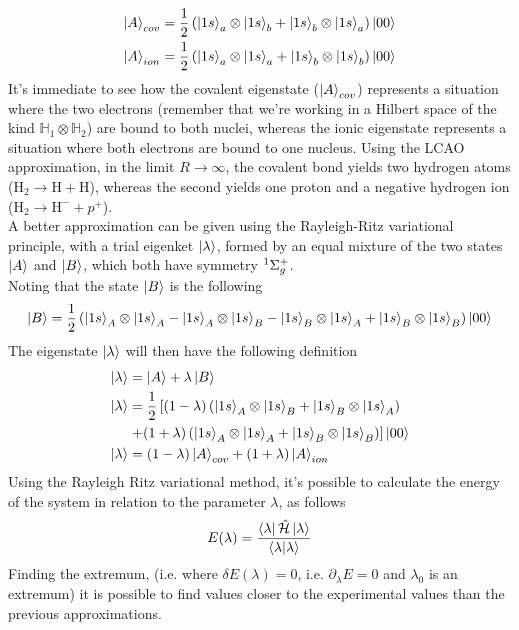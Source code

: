 \documentclass[../qm.tex]{subfiles}
\begin{document}
	\begin{equation}
		\begin{aligned}
			\ket{A}_{cov}&=\frac{1}{2}\left( \ket{1s}_a\otimes\ket{1s}_b+\ket{1s}_b\otimes\ket{1s}_a \right)\ket{00}\\
			\ket{A}_{ion}&=\frac{1}{2}\left( \ket{1s}_a\otimes\ket{1s}_a+\ket{1s}_b\otimes\ket{1s}_b \right)\ket{00}
		\end{aligned}
		\label{eq:ioniccovalentbonding}
	\end{equation}
	It's immediate to see how the covalent eigenstate ($\ket{A}_{cov}$) represents a situation where the two electrons (remember that we're working in a Hilbert space of the kind $\mathbb{H}_1\otimes\mathbb{H}_2$) are bound to both nuclei, whereas the ionic eigenstate represents a situation where both electrons are bound to one nucleus. Using the LCAO approximation, in the limit $R\to\infty$, the covalent bond yields two hydrogen atoms ($\mathrm{H}_2\to\mathrm{H}+\mathrm{H}$), whereas the second yields one proton and a negative hydrogen ion ($\mathrm{H}_2\to\mathrm{H}^-+p^+$).\\
	A better approximation can be given using the Rayleigh-Ritz variational principle, with a trial eigenket $\ket{\lambda}$, formed by an equal mixture of the two states $\ket{A}$ and $\ket{B}$, which both have symmetry $\term[g]{\Sigma^+}{1}$.\\
	Noting that the state $\ket{B}$ is the following
	\begin{equation*}
		\ket{B}=\frac{1}{2}\left( \ket{1s}_A\otimes\ket{1s}_A-\ket{1s}_A\otimes\ket{1s}_B-\ket{1s}_B\otimes\ket{1s}_A+\ket{1s}_B\otimes\ket{1s}_B \right)\ket{00}
	\end{equation*}
	The eigenstate $\ket{\lambda}$ will then have the following definition
	\begin{equation}
		\begin{aligned}
			\ket{\lambda}&=\ket{A}+\lambda\ket{B}\\
			\ket{\lambda}&=\frac{1}{2}\left[ (1-\lambda)\left( \ket{1s}_A\otimes\ket{1s}_B+\ket{1s}_B\otimes\ket{1s}_A \right)\right.\\
			&\left.+(1+\lambda)\left( \ket{1s}_A\otimes\ket{1s}_A+\ket{1s}_B\otimes\ket{1s}_B \right) \right]\ket{00}\\
			\ket{\lambda}&=(1-\lambda)\ket{A}_{cov}+(1+\lambda)\ket{A}_{ion}
		\end{aligned}
		\label{eq:ketlambda}
	\end{equation}
	Using the Rayleigh Ritz variational method, it's possible to calculate the energy of the system in relation to the parameter $\lambda$, as follows
	\begin{equation}
		E(\lambda)=\frac{\bra{\lambda}\opr{\ham}\ket{\lambda}}{\bra{\lambda}\ket{\lambda}}
		\label{eq:rayleighritzvariationalmolen}
	\end{equation}
	Finding the extremum, (i.e. where $\delta E(\lambda)=0$, i.e. $\partial_{\lambda}E=0$ and $\lambda_0$ is an extremum) it is possible to find values closer to the experimental values than the previous approximations.
\end{document}
